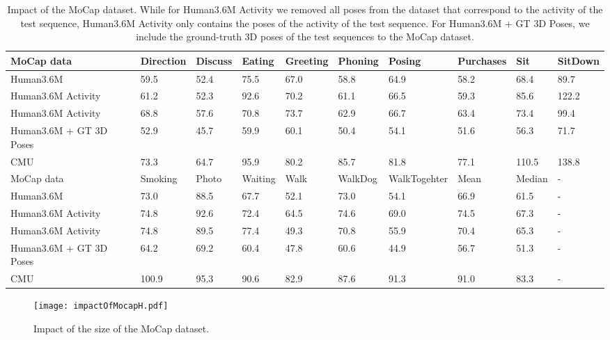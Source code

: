 \documentclass[10pt,journal,compsoc]{IEEEtran}
\begin{document}
\begin{table*}[!]
\centering
\begin{tabularx}{\linewidth}{lsssssssss}
\toprule \midrule
MoCap data 				& Direction		& Discuss		& Eating	& Greeting 		& Phoning 		& Posing		& Purchases 		& Sit 			& SitDown	\\
\midrule \midrule
Human3.6M				& 59.5			&52.4			&75.5		&67.0			&58.8			&64.9			&58.2			&68.4			& 89.7		\\	
Human3.6M   Activity		& 61.2			&52.3			&92.6		&70.2			&61.1			&66.5			&59.3			&85.6			& 122.2		\\ 
Human3.6M   Activity		& 68.8			&57.6			&70.8		&73.7			&62.9			&66.7			&63.4			&73.4			& 99.4		\\ 
Human3.6M + GT 3D Poses			& 52.9			&45.7			&59.9		&60.1			&50.4			&54.1			&51.6			&56.3			& 71.7		\\
CMU					& 73.3			&64.7			&95.9		&80.2			&85.7			&81.8			&77.1			&110.5			& 138.8	 	\\ 
\midrule \midrule
MoCap data  				& Smoking 		& Photo 		& Waiting 	& Walk 			& WalkDog 		& WalkTogehter 		& Mean 			& Median 		& -\\
\midrule
\midrule
Human3.6M				& 73.0			&88.5			&67.7		&52.1			&73.0			&54.1			&66.9			&61.5		 	&-\\
Human3.6M   Activity 	&74.8			&92.6			&72.4		&64.5			&74.6			&69.0			&74.5			&67.3			&-\\
Human3.6M   Activity 		&74.8			&89.5			&77.4		&49.3			&70.8			&55.9			&70.4			&65.3			&-\\
Human3.6M + GT 3D Poses			&64.2			&69.2			&60.4		&47.8			&60.6			&44.9			&56.7			&51.3			&-\\
CMU					&100.9			&95.3			&90.6		&82.9			&87.6			&91.3			&91.0			&83.3			&-\\
\bottomrule
\end{tabularx}
\caption{Impact of the MoCap dataset. While for Human3.6M   Activity we removed all poses from the dataset that correspond to the activity of the test sequence, Human3.6M   Activity only contains the poses of the activity of the test sequence. For Human3.6M + GT 3D Poses, we include the ground-truth 3D poses of the test sequences to the MoCap dataset.}
\label{tab:impactOfMoCap}
\end{table*}

\begin{figure}[t]
\begin{center}
\texttt{[image: impactOfMocapH.pdf]}
\end{center}
   \caption{Impact of the size of the MoCap dataset. }
\label{fig:impactOfMocapH}
\end{figure}
\end{document}
